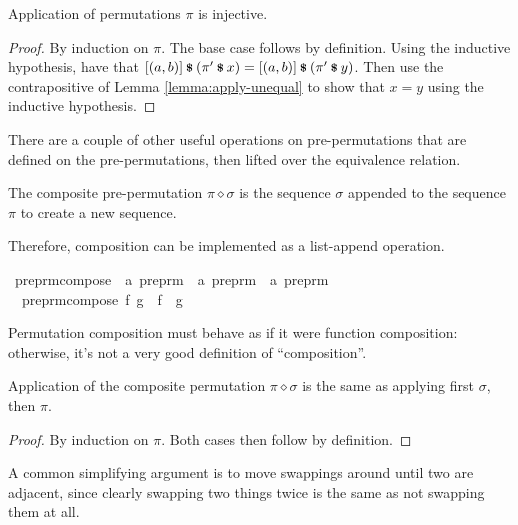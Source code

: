 \begin{lemma}
Application of permutations \(\pi\) is injective.
\end{lemma}
\begin{proof}
By induction on \(\pi\).
The base case follows by definition.
Using the inductive hypothesis, have that \([(a, b)] \mathbin{\textrm{\footnotesize{\textbf{\$}}}} \left(\pi' \mathbin{\textrm{\footnotesize{\textbf{\$}}}} x\right) = [(a, b)] \mathbin{\textrm{\footnotesize{\textbf{\$}}}} \left(\pi' \mathbin{\textrm{\footnotesize{\textbf{\$}}}} y\right)\).
Then use the contrapositive of Lemma \ref{lemma:apply-unequal} to show that \(x = y\) using the inductive hypothesis.
\end{proof}

There are a couple of other useful operations on pre-permutations that are defined on the pre-permutations, then lifted over the equivalence relation.

\begin{definition}
The composite pre-permutation \(\pi \diamond \sigma\) is the sequence \(\sigma\) appended to the sequence \(\pi\) to create a new sequence.
\end{definition}
Therefore, composition can be implemented as a list-append operation.

\begin{implementation}
\isamarkupfalse%
\ preprm{\isacharunderscore}compose\ {\isacharcolon}{\isacharcolon}\ {\isachardoublequoteopen}{\isacharprime}a\ preprm\ {\isasymRightarrow}\ {\isacharprime}a\ preprm\ {\isasymRightarrow}\ {\isacharprime}a\ preprm{\isachardoublequoteclose}\ \isanewline
\ \ {\isachardoublequoteopen}preprm{\isacharunderscore}compose\ f\ g\ {\isasymequiv}\ f\ {\isacharat}\ g{\isachardoublequoteclose}\isanewline
\end{implementation}

Permutation composition must behave as if it were function composition: otherwise, it's not a very good definition of ``composition''.

\begin{lemma}
\label{lemma:apply-composition}
Application of the composite permutation \(\pi \diamond \sigma\) is the same as applying first \(\sigma\), then \(\pi\).
\end{lemma}
\begin{proof}
By induction on \(\pi\).
Both cases then follow by definition.
\end{proof}

A common simplifying argument is to move swappings around until two are adjacent, since clearly swapping two things twice is the same as not swapping them at all.

